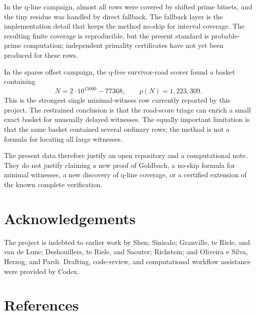 \documentclass[11pt]{article}
\begin{document}
In the q-line campaign, almost all rows were covered by shifted prime bitsets,
and the tiny residue was handled by direct fallback. The fallback layer is the
implementation detail that keeps the method no-skip for interval coverage. The
resulting finite coverage is reproducible, but the present standard is
probable-prime computation; independent primality certificates have not yet
been produced for these rows.

In the sparse offset campaign, the q-free survivor-road scorer found a basket
containing
\[
  N=2\cdot10^{15000}-77368,\qquad p(N)=1{,}223{,}309.
\]
This is the strongest single minimal-witness row currently reported by this
project. The restrained conclusion is that the road-score triage can enrich a
small exact basket for unusually delayed witnesses. The equally important
limitation is that the same basket contained several ordinary rows; the
method is not a formula for locating all large witnesses.

The present data therefore justify an open repository and a computational note.
They do not justify claiming a new proof of Goldbach, a no-skip formula for
minimal witnesses, a new discovery of q-line coverage, or a certified extension
of the known complete verification.

\section*{Acknowledgements}

The project is indebted to earlier work by Shen; Sinisalo; Granville, te Riele,
and van de Lune; Deshouillers, te Riele, and Saouter; Richstein; and Oliveira
e Silva, Herzog, and Pardi. Drafting, code-review, and computational workflow
assistance were provided by Codex.

\section*{References}
\end{document}
